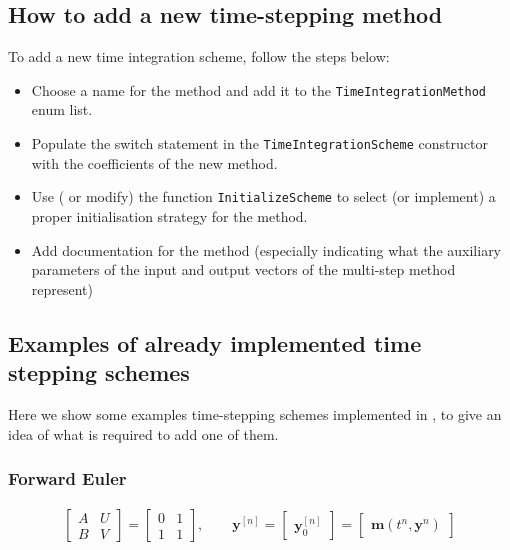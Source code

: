 \subsection{How to add a new time-stepping method}

To add a new time integration scheme, follow the steps below:
\begin{itemize}
\item Choose a name for the method and add it to the
\texttt{TimeIntegrationMethod} enum list.
\item Populate the switch statement in the \texttt{TimeIntegrationScheme}
constructor with the coefficients of the new method.
\item Use ( or modify) the function \texttt{InitializeScheme} to select (or
implement) a proper initialisation strategy for the method.
\item Add documentation for the method (especially indicating what the auxiliary
 parameters of the input and output vectors of the multi-step method represent)
\end{itemize}

\subsection{Examples of already implemented time stepping schemes}

Here we show some examples time-stepping schemes implemented in {\nek}, to give an idea of what is required
to add one of them.

\subsubsection{Forward Euler}
\begin{align*}
\left[\begin{array}{c|c}
A & U \\
\hline
B & V
\end{array}\right] =
\left[\begin{array}{c|c}
0 & 1 \\
\hline
1 & 1
\end{array}\right],\qquad
\boldsymbol{y}^{[n]}=
\left[\begin{array}{c}
\boldsymbol{y}^{[n]}_0
\end{array}\right]=
\left[\begin{array}{c}
\boldsymbol{m}\left(t^n,\boldsymbol{y}^{n}\right)
\end{array}\right]
\end{align*}

